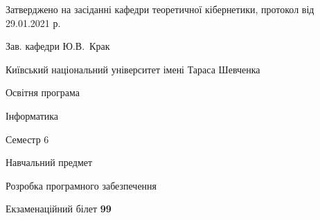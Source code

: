 \documentclass[10pt, ukrainian]{article}
\begin{document}
{\vspace{5mm}\smallskip \begin {small} Затверджено на засіданні кафедри теоретичної кібернетики, протокол  від   29.01.2021 р.\par\smallskip\smallskip
{\parbox {6.5 cm}{Зав. кафедри \dotfill Ю.В.~Крак}} \end{small}}
\newpage

{{\begin {small}\par
{ \center  Київський національний університет імені Тараса Шевченка \par}
{\parbox {5 cm}{Освітня програма \hfill}{\parbox {7 cm}{Інформатика \hfill}}\parbox {6 cm}{\hfill Семестр 6}}\par
{\parbox {5 cm} {Навчальний предмет \hfill}\parbox {7 cm}{Розробка програмного забезпечення \hfill}\parbox {6cm}{\hfill}\par}\vspace{-7pt} \end{small}}{\center Екзаменаційний білет \No \textbf
{ 99 }\par}}
\end{document}
